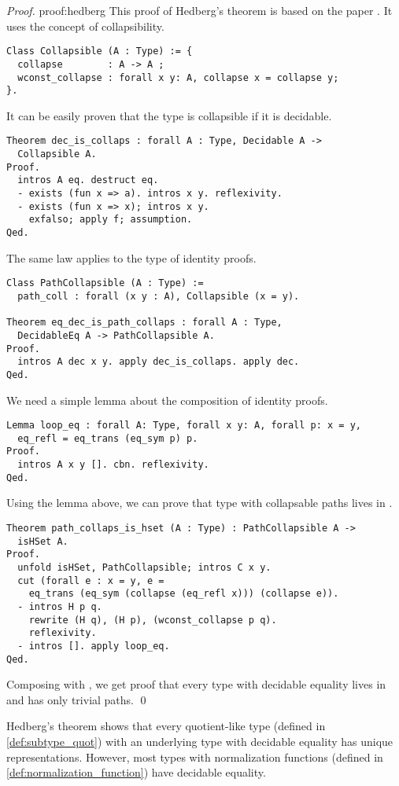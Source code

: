 \begin{proof}{}{proof:hedberg}
This proof of Hedberg's theorem is based on the paper \cite{HedbergProof}. It uses the concept of collapsibility.
\begin{verbatim}
Class Collapsible (A : Type) := { 
  collapse        : A -> A ;
  wconst_collapse : forall x y: A, collapse x = collapse y;
}.
\end{verbatim}
It can be easily proven that the type is collapsible if it is decidable.
\begin{verbatim}
Theorem dec_is_collaps : forall A : Type, Decidable A -> 
  Collapsible A.
Proof.
  intros A eq. destruct eq.
  - exists (fun x => a). intros x y. reflexivity.
  - exists (fun x => x); intros x y.
    exfalso; apply f; assumption.
Qed.
\end{verbatim}
The same law applies to the type of identity proofs.
\begin{verbatim}
Class PathCollapsible (A : Type) :=
  path_coll : forall (x y : A), Collapsible (x = y).

Theorem eq_dec_is_path_collaps : forall A : Type, 
  DecidableEq A -> PathCollapsible A.
Proof.
  intros A dec x y. apply dec_is_collaps. apply dec.
Qed.
\end{verbatim}
We need a simple lemma about the composition of identity proofs.
\begin{verbatim}
Lemma loop_eq : forall A: Type, forall x y: A, forall p: x = y, 
  eq_refl = eq_trans (eq_sym p) p.
Proof.
  intros A x y []. cbn. reflexivity.
Qed.
\end{verbatim}
Using the lemma above, we can prove that type with collapsable paths lives in .
\begin{verbatim}
Theorem path_collaps_is_hset (A : Type) : PathCollapsible A -> 
  isHSet A.
Proof.
  unfold isHSet, PathCollapsible; intros C x y.
  cut (forall e : x = y, e = 
    eq_trans (eq_sym (collapse (eq_refl x))) (collapse e)).
  - intros H p q. 
    rewrite (H q), (H p), (wconst_collapse p q).
    reflexivity.
  - intros []. apply loop_eq.
Qed.
\end{verbatim}
Composing  with , we get proof that every type with decidable equality lives in  and has only trivial paths. \qed
\end{proof}
Hedberg's theorem shows that every quotient-like type (defined in \ref{def:subtype_quot}) with an underlying type with decidable equality has unique representations. However, most types with normalization functions (defined in \ref{def:normalization_function}) have decidable equality.
